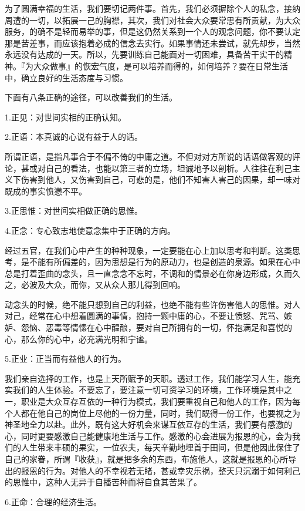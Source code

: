 \documentclass[twoside,openany]{book}
\begin{document}
为了圆满幸福的生活，我们要切记两件事。首先，我们必须摒除个人的私念，接纳周遭的一切，以拓展一己的胸襟，其次，我们对社会大众要常思有所贡献，为大众服务，的确不是轻而易举的事，但是这仍然关系到一个人的观念问题，你不要认定那是苦差事，而应该抱着必成的信念去实行。如果事情还未尝试，就先却步，当然永远没有达成的一天。所以，先要训练自己能面对一切困难，具备苦干实干的精神。『为大众做事』的恢宏气度，是可以培养而得的，如何培养？要在日常生活中，确立良好的生活态度与习惯。

下面有八条正确的途径，可以改善我们的生活。

1.正见：对世间实相的正确认知。

2.正语：本真诚的心说有益于人的话。

所谓正语，是指凡事合于不偏不倚的中庸之道。不但对对方所说的话语做客观的评论，甚或对自己的看法，也能以第三者的立场，坦诚地予以剖析。人往往在利己主义下伤害到他人，又伤害到自己，可悲的是，他们不知害人害己的因果，却一味对既成的事实愤懑不平。

3.正思惟：对世间实相做正确的思惟。

4.正念：专心致志地使意念集中于正确的方向。

经过五官，在我们心中产生的种种现象，一定要能在心上加以思考和判断。这类思考，是不能有所偏差的，因为思想是行为的原动力，也是创造的泉源。如果在心中总是打着歪曲的念头，且一直念念不忘时，不调和的情景必在你身边形成，久而久之，必波及大众，而你，又从众人那儿得到回响。

动念头的时候，绝不能只想到自己的利益，也绝不能有些许伤害他人的思惟。对人对己，经常在心中想着圆满的事情，抱持一颗中庸的心，不要让愤怒、咒骂、嫉妒、怨恼、恶毒等情愫在心中醖酿，要对自己所拥有的一切，怀抱满足和喜悦的心，那么你的心中，必充满光明和宁谧。

5.正业：正当而有益他人的行为。

我们亲自选择的工作，也是上天所赋予的天职。透过工作，我们能学习人生，能充实我们的人生体验。不要忘了，要注意一切可资学习的环境，工作环境是其中之一，职业是大众互存互依的一种行为模式，我们要重视自己和他人的工作，因为每个人都在他自己的岗位上尽他的一份力量，同时，我们既得一份工作，也要视之为神圣地全力以赴。此外，既有这大好机会来谋互依互存的生活，我们要有感激的心，同时更要感激自己能健康地生活与工作。感激的心会进展为报恩的心，会为我们的人生带来丰硕的果实，一位农夫，每天辛勤地埋首于田间，但是他因此保住了自己的家眷，所谓『收获』，就是把多余的东西，布施他人，这就是报恩的心所导出的报恩的行为。对他人的不幸视若无睹，甚或幸灾乐祸，整天只沉溺于如何利己的思惟中，这种人无异于自播苦种而将自食其苦果了。

6.正命：合理的经济生活。
\end{document}

